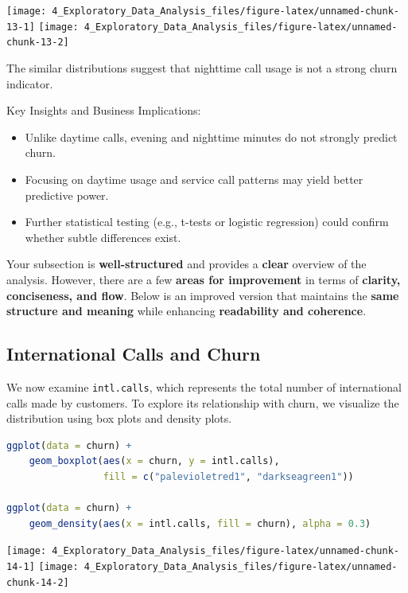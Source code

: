 \documentclass[
  11pt,
]{book}
\newcommand{\passthrough}[1]{#1}
\providecommand{\tightlist}{%
  \setlength{\itemsep}{0pt}\setlength{\parskip}{0pt}}
\theoremstyle{definition}
\theoremstyle{definition}
\theoremstyle{definition}
\theoremstyle{definition}
\theoremstyle{remark}
\begin{document}
\texttt{[image: 4\_Exploratory\_Data\_Analysis\_files/figure-latex/unnamed-chunk-13-1]} \texttt{[image: 4\_Exploratory\_Data\_Analysis\_files/figure-latex/unnamed-chunk-13-2]}

The similar distributions suggest that nighttime call usage is not a strong churn indicator.

Key Insights and Business Implications:

\begin{itemize}
\tightlist
\item
  Unlike daytime calls, evening and nighttime minutes do not strongly predict churn.\\
\item
  Focusing on daytime usage and service call patterns may yield better predictive power.\\
\item
  Further statistical testing (e.g., t-tests or logistic regression) could confirm whether subtle differences exist.
\end{itemize}

Your subsection is \textbf{well-structured} and provides a \textbf{clear} overview of the analysis. However, there are a few \textbf{areas for improvement} in terms of \textbf{clarity, conciseness, and flow}. Below is an improved version that maintains the \textbf{same structure and meaning} while enhancing \textbf{readability and coherence}.

\subsection*{International Calls and Churn}\label{international-calls-and-churn}


We now examine \passthrough{\lstinline!intl.calls!}, which represents the total number of international calls made by customers. To explore its relationship with churn, we visualize the distribution using box plots and density plots.

\begin{lstlisting}[language=R]
ggplot(data = churn) +
    geom_boxplot(aes(x = churn, y = intl.calls), 
                 fill = c("palevioletred1", "darkseagreen1"))

ggplot(data = churn) +
    geom_density(aes(x = intl.calls, fill = churn), alpha = 0.3)
\end{lstlisting}

\texttt{[image: 4\_Exploratory\_Data\_Analysis\_files/figure-latex/unnamed-chunk-14-1]} \texttt{[image: 4\_Exploratory\_Data\_Analysis\_files/figure-latex/unnamed-chunk-14-2]}
\end{document}
